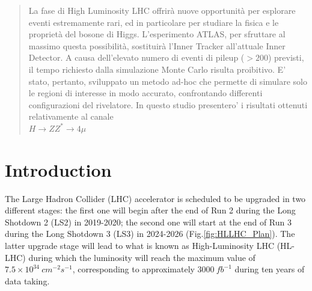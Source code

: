 \documentclass[a4paper,twoside,12pt]{article}
\begin{document}


\maketitle


\tableofcontents
\newpage

\begin{abstract}
La fase di High Luminosity LHC offrirà nuove opportunità per esplorare eventi estremamente rari, ed in particolare per studiare la fisica e le proprietà del bosone di Higgs.
L’esperimento ATLAS, per sfruttare al massimo questa possibilità, sostituirà l’Inner Tracker  all’attuale Inner Detector.
A causa dell'elevato numero di eventi di pileup ($>200$) previsti, il tempo richiesto dalla simulazione Monte Carlo risulta proibitivo. E’ stato, pertanto, sviluppato un metodo ad-hoc che permette di simulare solo le regioni di interesse in modo accurato, confrontando differenti configurazioni del rivelatore. In questo studio presentero' i risultati ottenuti relativamente al canale\\ {$H\rightarrow ZZ^*\rightarrow 4\mu$}
\end{abstract}

\newpage

\section{Introduction} \label{sec:introduction}
The Large Hadron Collider (LHC) accelerator is scheduled to be upgraded in two different stages: the first one will begin after the end of Run 2 during the Long Shotdown 2 (LS2) in 2019-2020; the second one will start at the end of Run 3 during the Long Shotdown 3 (LS3) in 2024-2026 (Fig.\ref{fig:HLLHC_Plan}). The latter upgrade stage will lead to what is known as High-Luminosity LHC (HL-LHC) during which the
luminosity will reach the maximum value of $7.5 \times 10^{34}\ cm^{-2}s^{-1}$, corresponding to approximately $3000\ fb^{-1}$ during ten years of data taking. \\
\end{document}
